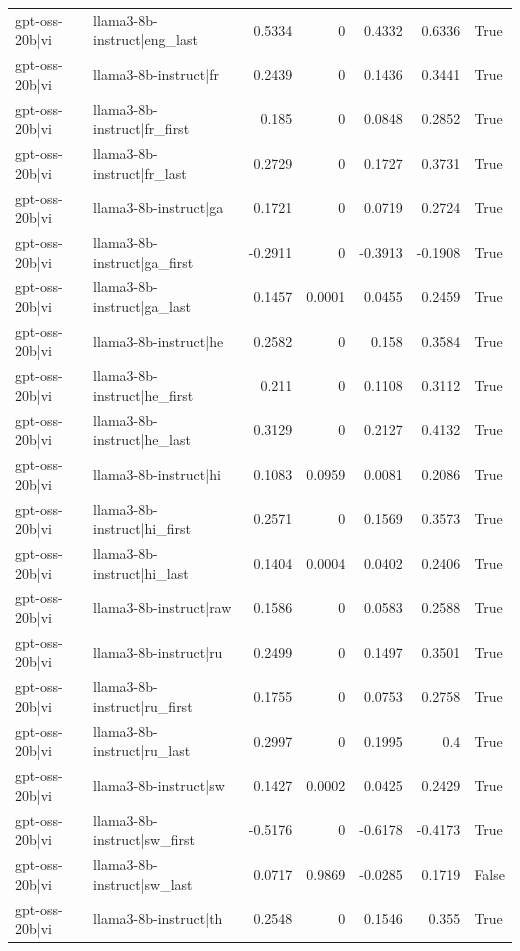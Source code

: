 \begin{table}
\begin{tabular}{l l r r r r l}
gpt-oss-20b|vi & llama3-8b-instruct|eng_last & 0.5334 & 0 & 0.4332 & 0.6336 & True \\
gpt-oss-20b|vi & llama3-8b-instruct|fr & 0.2439 & 0 & 0.1436 & 0.3441 & True \\
gpt-oss-20b|vi & llama3-8b-instruct|fr_first & 0.185 & 0 & 0.0848 & 0.2852 & True \\
gpt-oss-20b|vi & llama3-8b-instruct|fr_last & 0.2729 & 0 & 0.1727 & 0.3731 & True \\
gpt-oss-20b|vi & llama3-8b-instruct|ga & 0.1721 & 0 & 0.0719 & 0.2724 & True \\
gpt-oss-20b|vi & llama3-8b-instruct|ga_first & -0.2911 & 0 & -0.3913 & -0.1908 & True \\
gpt-oss-20b|vi & llama3-8b-instruct|ga_last & 0.1457 & 0.0001 & 0.0455 & 0.2459 & True \\
gpt-oss-20b|vi & llama3-8b-instruct|he & 0.2582 & 0 & 0.158 & 0.3584 & True \\
gpt-oss-20b|vi & llama3-8b-instruct|he_first & 0.211 & 0 & 0.1108 & 0.3112 & True \\
gpt-oss-20b|vi & llama3-8b-instruct|he_last & 0.3129 & 0 & 0.2127 & 0.4132 & True \\
gpt-oss-20b|vi & llama3-8b-instruct|hi & 0.1083 & 0.0959 & 0.0081 & 0.2086 & True \\
gpt-oss-20b|vi & llama3-8b-instruct|hi_first & 0.2571 & 0 & 0.1569 & 0.3573 & True \\
gpt-oss-20b|vi & llama3-8b-instruct|hi_last & 0.1404 & 0.0004 & 0.0402 & 0.2406 & True \\
gpt-oss-20b|vi & llama3-8b-instruct|raw & 0.1586 & 0 & 0.0583 & 0.2588 & True \\
gpt-oss-20b|vi & llama3-8b-instruct|ru & 0.2499 & 0 & 0.1497 & 0.3501 & True \\
gpt-oss-20b|vi & llama3-8b-instruct|ru_first & 0.1755 & 0 & 0.0753 & 0.2758 & True \\
gpt-oss-20b|vi & llama3-8b-instruct|ru_last & 0.2997 & 0 & 0.1995 & 0.4 & True \\
gpt-oss-20b|vi & llama3-8b-instruct|sw & 0.1427 & 0.0002 & 0.0425 & 0.2429 & True \\
gpt-oss-20b|vi & llama3-8b-instruct|sw_first & -0.5176 & 0 & -0.6178 & -0.4173 & True \\
gpt-oss-20b|vi & llama3-8b-instruct|sw_last & 0.0717 & 0.9869 & -0.0285 & 0.1719 & False \\
gpt-oss-20b|vi & llama3-8b-instruct|th & 0.2548 & 0 & 0.1546 & 0.355 & True \\

\end{tabular}
\end{table}
